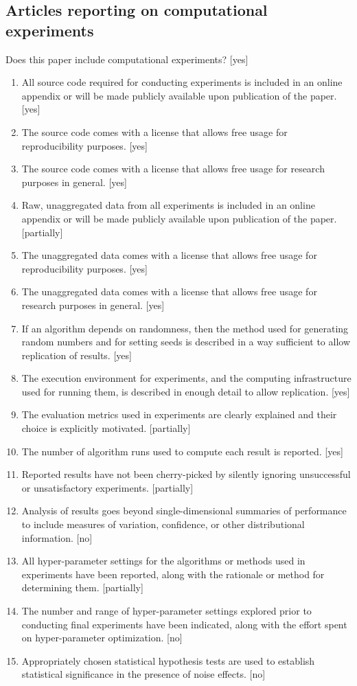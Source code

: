 \documentclass[manuscript,screen,review]{jair}
\begin{document}
\subsection*{Articles reporting on computational experiments}
Does this paper include computational experiments? [yes]
\begin{enumerate}[leftmargin=*]
  \item All source code required for conducting experiments is included in an online appendix or will be made publicly available upon publication of the paper. [yes]
  \item The source code comes with a license that allows free usage for reproducibility purposes. [yes]
  \item The source code comes with a license that allows free usage for research purposes in general. [yes]
  \item Raw, unaggregated data from all experiments is included in an online appendix or will be made publicly available upon publication of the paper. [partially]
  \item The unaggregated data comes with a license that allows free usage for reproducibility purposes. [yes]
  \item The unaggregated data comes with a license that allows free usage for research purposes in general. [yes]
  \item If an algorithm depends on randomness, then the method used for generating random numbers and for setting seeds is described in a way sufficient to allow replication of results. [yes]
  \item The execution environment for experiments, and the computing infrastructure used for running them, is described in enough detail to allow replication. [yes]
  \item The evaluation metrics used in experiments are clearly explained and their choice is explicitly motivated. [partially]
  \item The number of algorithm runs used to compute each result is reported. [yes]
  \item Reported results have not been cherry-picked by silently ignoring unsuccessful or unsatisfactory experiments. [partially]
  \item Analysis of results goes beyond single-dimensional summaries of performance to include measures of variation, confidence, or other distributional information. [no]
  \item All hyper-parameter settings for the algorithms or methods used in experiments have been reported, along with the rationale or method for determining them. [partially]
  \item The number and range of hyper-parameter settings explored prior to conducting final experiments have been indicated, along with the effort spent on hyper-parameter optimization. [no]
  \item Appropriately chosen statistical hypothesis tests are used to establish statistical significance in the presence of noise effects. [no]
\end{enumerate}
\end{document}
